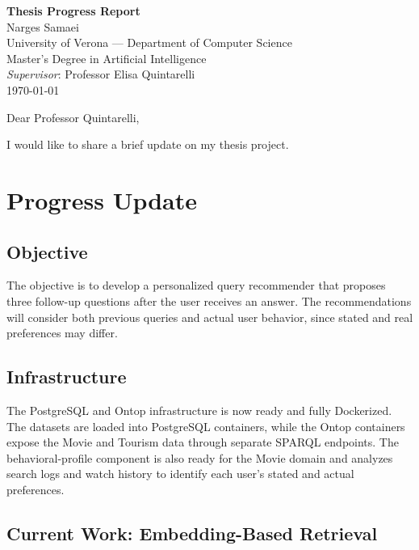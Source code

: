 \documentclass[a4paper,11pt]{report}
\begin{document}
\begin{center}
{\LARGE\bfseries Thesis Progress Report}\\[0.3cm]
Narges Samaei\\
University of Verona --- Department of Computer Science\\
Master's Degree in Artificial Intelligence\\
\emph{Supervisor}: Professor Elisa Quintarelli\\
\today
\end{center}

\vspace{0.8cm}

\noindent Dear Professor Quintarelli,

\vspace{0.3cm}

\noindent I would like to share a brief update on my thesis project.

\chapter{Progress Update}

\section{Objective}

The objective is to develop a personalized query recommender that proposes three follow-up
questions after the user receives an answer. The recommendations will consider both previous
queries and actual user behavior, since stated and real preferences may differ.

\section{Infrastructure}

The PostgreSQL and Ontop infrastructure is now ready and fully Dockerized. The datasets are
loaded into PostgreSQL containers, while the Ontop containers expose the Movie and Tourism data
through separate SPARQL endpoints. The behavioral-profile component is also ready for the Movie
domain and analyzes search logs and watch history to identify each user's stated and actual
preferences.

\section{Current Work: Embedding-Based Retrieval}
\end{document}
